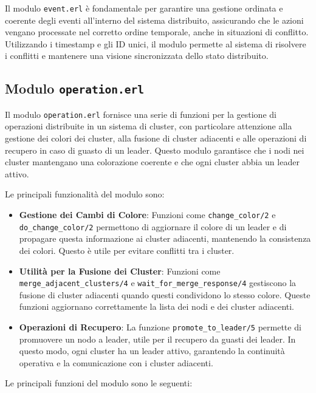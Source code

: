 \documentclass[12pt, a4paper]{report}
\begin{document}
\noindent
Il modulo \texttt{event.erl} è fondamentale per garantire una gestione ordinata e coerente degli eventi all'interno del sistema distribuito, assicurando che le azioni vengano processate nel corretto ordine temporale, anche in situazioni di conflitto. Utilizzando i timestamp e gli ID unici, il modulo permette al sistema di risolvere i conflitti e mantenere una visione sincronizzata dello stato distribuito.


\subsection{Modulo \texttt{operation.erl}}

Il modulo \texttt{operation.erl} fornisce una serie di funzioni per la gestione di operazioni distribuite in un sistema di cluster, con particolare attenzione alla gestione dei colori dei cluster, alla fusione di cluster adiacenti e alle operazioni di recupero in caso di guasto di un leader. Questo modulo garantisce che i nodi nei cluster mantengano una colorazione coerente e che ogni cluster abbia un leader attivo.

Le principali funzionalità del modulo sono:

\begin{itemize}
    \item \textbf{Gestione dei Cambi di Colore}: Funzioni come \texttt{change\_color/2} e \texttt{do\_change\_color/2} permettono di aggiornare il colore di un leader e di propagare questa informazione ai cluster adiacenti, mantenendo la consistenza dei colori. Questo è utile per evitare conflitti tra i cluster.

    \item \textbf{Utilità per la Fusione dei Cluster}: Funzioni come \texttt{merge\_adjacent\_clusters/4} e \texttt{wait\_for\_merge\_response/4} gestiscono la fusione di cluster adiacenti quando questi condividono lo stesso colore. Queste funzioni aggiornano correttamente la lista dei nodi e dei cluster adiacenti.

    \item \textbf{Operazioni di Recupero}: La funzione \texttt{promote\_to\_leader/5} permette di promuovere un nodo a leader, utile per il recupero da guasti dei leader. In questo modo, ogni cluster ha un leader attivo, garantendo la continuità operativa e la comunicazione con i cluster adiacenti.

\end{itemize}

\noindent
Le principali funzioni del modulo sono le seguenti:
\end{document}
